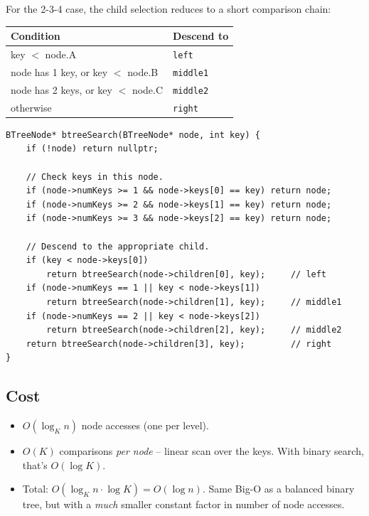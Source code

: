 \documentclass[11pt]{article}
\begin{document}
For the 2-3-4 case, the child selection reduces to a short comparison chain:

\begin{center}
\begin{tabular}{ll}
\hline
Condition & Descend to \\
\hline
key $<$ node.A & \texttt{left} \\
node has 1 key, or key $<$ node.B & \texttt{middle1} \\
node has 2 keys, or key $<$ node.C & \texttt{middle2} \\
otherwise & \texttt{right} \\
\hline
\end{tabular}
\end{center}

\begin{lstlisting}[basicstyle=\ttfamily\small,frame=single]
BTreeNode* btreeSearch(BTreeNode* node, int key) {
    if (!node) return nullptr;

    // Check keys in this node.
    if (node->numKeys >= 1 && node->keys[0] == key) return node;
    if (node->numKeys >= 2 && node->keys[1] == key) return node;
    if (node->numKeys >= 3 && node->keys[2] == key) return node;

    // Descend to the appropriate child.
    if (key < node->keys[0])
        return btreeSearch(node->children[0], key);     // left
    if (node->numKeys == 1 || key < node->keys[1])
        return btreeSearch(node->children[1], key);     // middle1
    if (node->numKeys == 2 || key < node->keys[2])
        return btreeSearch(node->children[2], key);     // middle2
    return btreeSearch(node->children[3], key);         // right
}
\end{lstlisting}

\subsection*{Cost}

\begin{itemize}[leftmargin=*]
    \item $O(\log_K n)$ node accesses (one per level).
    \item $O(K)$ comparisons \emph{per node} -- linear scan over the keys. With binary search, that's $O(\log K)$.
    \item Total: $O(\log_K n \cdot \log K) = O(\log n)$. Same Big-O as a balanced binary tree, but with a \emph{much} smaller constant factor in number of node accesses.
\end{itemize}
\end{document}
